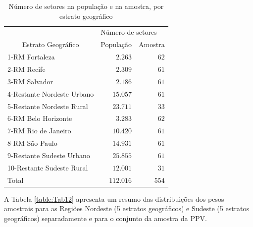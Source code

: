 \documentclass[]{book}
\numberwithin{example}{chapter}
\numberwithin{remark}{chapter}
\numberwithin{definition}{chapter}
\begin{document}
\begin{center}
\begin{table}[htbp] \centering

\caption{Número de setores na população e na amostra, por estrato geográfico}
\bigskip \label{table:Tab11}
\begin{tabular}{|l|c|c|}
\hline\hline
& \multicolumn{2}{|l|}{Número de setores} \\ \cline{2-3}
\multicolumn{1}{|c|}{Estrato Geográfico} & População & Amostra
\\ \hline\hline
1-RM Fortaleza & \multicolumn{1}{|r|}{$2.263$} & \multicolumn{1}{|r|}{$62$}
\\ \hline
2-RM Recife & \multicolumn{1}{|r|}{$2.309$} & \multicolumn{1}{|r|}{$61$} \\
\hline
3-RM Salvador & \multicolumn{1}{|r|}{$2.186$} & \multicolumn{1}{|r|}{$61$}
\\ \hline
4-Restante Nordeste Urbano & \multicolumn{1}{|r|}{$15.057$} &
\multicolumn{1}{|r|}{$61$} \\ \hline
5-Restante Nordeste Rural & \multicolumn{1}{|r|}{$23.711$} &
\multicolumn{1}{|r|}{$33$} \\ \hline
6-RM Belo Horizonte & \multicolumn{1}{|r|}{$3.283$} & \multicolumn{1}{|r|}{$%
62$} \\ \hline
7-RM Rio de Janeiro & \multicolumn{1}{|r|}{$10.420$} & \multicolumn{1}{|r|}{$%
61$} \\ \hline
8-RM São Paulo & \multicolumn{1}{|r|}{$14.931$} & \multicolumn{1}{|r|}{$%
61$} \\ \hline
9-Restante Sudeste Urbano & \multicolumn{1}{|r|}{$25.855$} &
\multicolumn{1}{|r|}{$61$} \\ \hline
10-Restante Sudeste Rural & \multicolumn{1}{|r|}{$12.001$} &
\multicolumn{1}{|r|}{$31$} \\ \hline\hline
Total & \multicolumn{1}{|r|}{$112.016$} & \multicolumn{1}{|r|}{$554$} \\
\hline\hline
\end{tabular}
\end{table}
\end{center}

A Tabela \ref{table:Tab12} apresenta um resumo das distribuições dos
pesos amostrais para as Regiões Nordeste (5 estratos geográficos) e
Sudeste (5 estratos geográficos) separadamente e para o conjunto da
amostra da PPV.
\end{document}
